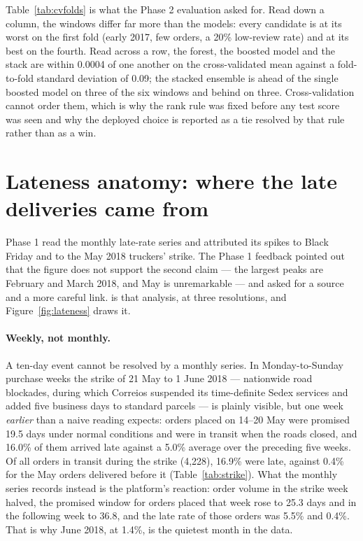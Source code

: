 Table~\ref{tab:cvfolds} is what the Phase 2 evaluation asked for. Read down a
column, the windows differ far more than the models: every candidate is at its
worst on the first fold (early 2017, few orders, a 20\% low-review rate) and at
its best on the fourth. Read across a row, the forest, the boosted model and the
stack are within 0.0004 of one another on the cross-validated mean against a fold-to-fold
standard deviation of 0.09; the stacked ensemble is ahead of the single boosted
model on three of the six windows and behind on three. Cross-validation cannot
order them, which is why the rank rule was fixed before any test score was seen
and why the deployed choice is reported as a tie resolved by that rule rather
than as a win.

\section{Lateness anatomy: where the late deliveries came from}
\label{app:lateness}

Phase 1 read the monthly late-rate series and attributed its spikes to Black
Friday and to the May 2018 truckers' strike. The Phase 1 feedback pointed out
that the figure does not support the second claim --- the largest peaks are
February and March 2018, and May is unremarkable --- and asked for a source and
a more careful link.  is that analysis, at three
resolutions, and Figure~\ref{fig:lateness} draws it.

\paragraph{Weekly, not monthly.} A ten-day event cannot be resolved by a
monthly series. In Monday-to-Sunday purchase weeks the strike of 21 May to
1 June 2018 \citep{bloomberg2018strike} --- nationwide road blockades, during
which Correios suspended its time-definite Sedex services and added five
business days to standard parcels \citep{tecnoblog2018correios} --- is plainly
visible, but one week \emph{earlier} than a naive reading expects: orders placed
on 14--20 May were promised 19.5 days under normal conditions and were in
transit when the roads closed, and 16.0\% of them arrived late against a 5.0\%
average over the preceding five weeks. Of all orders in transit during the
strike (4{,}228), 16.9\% were late, against 0.4\% for the May orders delivered
before it (Table~\ref{tab:strike}). What the monthly series records instead is
the platform's reaction: order volume in the strike week halved, the promised
window for orders placed that week rose to 25.3 days and in the following week
to 36.8, and the late rate of those orders was 5.5\% and 0.4\%. That is why June
2018, at 1.4\%, is the quietest month in the data.

